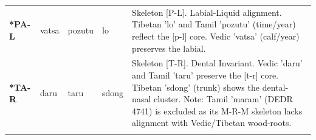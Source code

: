 \begin{longtable}{p{} p{} p{} p{} p{}}
\addlinespace[10pt]
\textbf{*PA-L} & vatsa & pozutu & lo & \small Skeleton [P-L]. Labial-Liquid alignment. Tibetan 'lo' and Tamil 'pozutu' (time/year) reflect the [p-l] core. Vedic 'vatsa' (calf/year) preserves the labial. \\ 
\addlinespace[10pt]
\textbf{*TA-R} & daru & taru & sdong & \small Skeleton [T-R]. Dental Invariant. Vedic 'daru' and Tamil 'taru' preserve the [t-r] core. Tibetan 'sdong' (trunk) shows the dental-nasal cluster. Note: Tamil 'maram' (DEDR 4741) is excluded as its M-R-M skeleton lacks alignment with Vedic/Tibetan wood-roots. \\ 
\addlinespace[10pt]
\end{longtable}